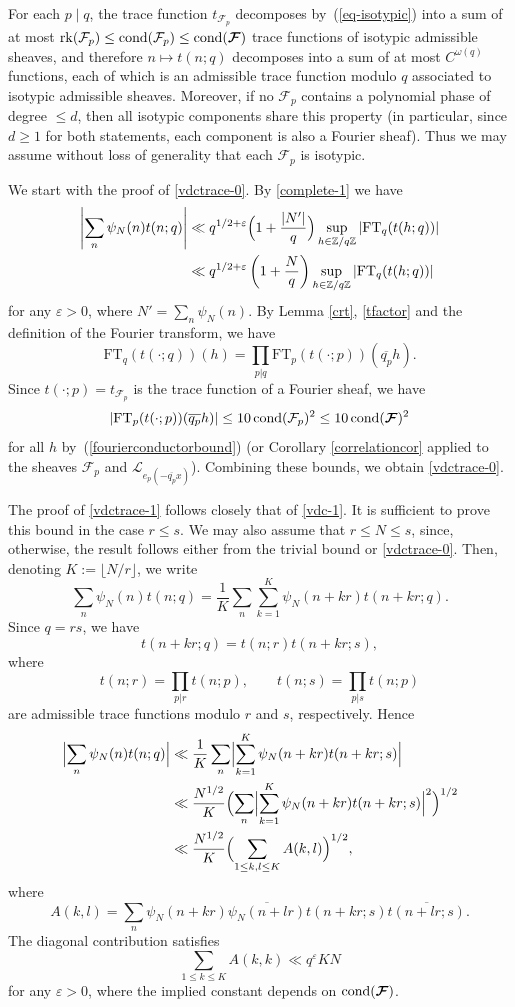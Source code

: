 \documentclass[12pt,a4paper,reqno]{amsart}
\numberwithin{equation}{section}
\DeclareMathOperator*\cond{cond}
\newcommand{\FT}{\mathrm{FT}}
\theoremstyle{plain}
\theoremstyle{definition}
\newcommand\eps{\varepsilon}
\newcommand{\uple}[1]{\text{\boldmath${#1}$}}
\newcommand\rk{\mathrm{rk}}
\newcommand\ov{\overline}
\newcommand\mcF{\mathcal{F}}
\newcommand\mcL{\mathcal{L}}
\newcommand\Zz{\mathbb{Z}}
\begin{document}
\proof For each $p \mid q$, the trace function $t_{\mcF_p}$ decomposes
by~(\ref{eq-isotypic}) into a sum of at most $\rk(\mcF_p)\leq
\cond(\mcF_p)\leq \cond(\uple{\mcF})$ trace functions of isotypic admissible
sheaves, and therefore $n\mapsto t(n;q)$ decomposes into a sum of at
most $C^{\omega(q)}$ functions, each of which is an admissible trace
function modulo $q$ associated to isotypic admissible
sheaves. Moreover, if no $\mcF_p$ contains a polynomial phase of
degree $\leq d$, then all isotypic components share this property (in
particular, since $d\geq 1$ for both statements, each component is
also a Fourier sheaf). Thus we may assume without loss of generality
that each $\mcF_p$ is isotypic.

We start with the proof of \eqref{vdctrace-0}. By \eqref{complete-1} we have 
\begin{align*}
  \left|\sum_n \psi_N(n) t(n;q)\right| &\ll
  q^{1/2+\eps}\Bigl(1+\frac{|N'|}q\Bigr)
  \sup_{h\in\Zz/q\Zz}|\FT_q(t(h;q))|\\
  &\ll
  q^{1/2+\eps}\left(1+\frac{N}q\right)\sup_{h\in\Zz/q\Zz}|\FT_q(t(h;q))|
\end{align*}
for any $\eps>0$, where $N'=\sum_n\psi_N(n)$.  By Lemma \ref{crt},
\eqref{tfactor} and the definition of the Fourier transform, we have
$$
\FT_q(t(\cdot;q))(h)=\prod_{p|q}\FT_{p}(t(\cdot;p))(\ov{q_p}h).
$$
Since $t(\cdot;p)=t_{\mcF_p}$ is the trace function of a Fourier
sheaf, we have
$$
|\FT_{p}(t(\cdot;p))(\ov{q_p}h)|\leq 10\cond(\mcF_p)^2\leq
10\cond(\uple{\mcF})^2
$$
for all $h$ by~(\ref{fourierconductorbound}) (or Corollary
\ref{correlationcor} applied to the sheaves $\mcF_p$ and
$\mcL_{e_p(-\ov{q_p}x)}$).  Combining these bounds, we obtain
\eqref{vdctrace-0}.

The proof of \eqref{vdctrace-1} follows closely that of
\eqref{vdc-1}. It is sufficient to prove this bound in the case $r\leq s$. We may also assume that $r\leq N\leq s$, since,
  otherwise, the result follows either from the trivial bound or \eqref{vdctrace-0}. Then, denoting $K := \lfloor N/r\rfloor$,
we write
$$
\sum_n \psi_N(n)t(n;q)=\frac{1}{K} \sum_n \sum_{k=1}^K \psi_N(n+kr)
t(n+kr;q).
$$
Since $q=rs$, we have 
$$
t(n+kr;q) = t(n;r)t(n+kr;s),
$$
where
$$
t(n;r)=\prod_{p|r}t(n;p),\quad\quad t(n;s)=\prod_{p|s}t(n;p)
$$
are admissible trace functions modulo $r$ and $s$, respectively. 
Hence
\begin{align*}
  \Bigl|\sum_n \psi_N(n) t(n;q)\Bigr| &\ll
  \frac{1}{K} \sum_n \Bigl|\sum_{k=1}^K \psi_N(n+kr) t(n+kr;s) \Bigr| \\
  & \ll \frac{N^{1/2}}{K} \Bigl(\sum_n \Bigl|\sum_{k=1}^K \psi_N(n+kr)
  t(n+kr;s)\Bigr|^2\Bigr)^{1/2}\\
  &\ll \frac{N^{1/2}}{K} \Bigl(\sum_{1\leq k,l\leq K}A(k,l)\Bigr)^{1/2},
\end{align*}
where
$$
A(k,l)=\sum_n \psi_N(n+kr)
\overline{\psi_N(n+lr)}t(n+kr;s)\overline{t(n+lr;s)}.
$$
The diagonal contribution satisfies
$$
\sum_{1\leq k\leq K}A(k,k) \ll q^{\eps}KN
$$
for any $\eps>0$, where the implied constant depends on
$\cond(\uple{\mcF})$.
\end{document}
